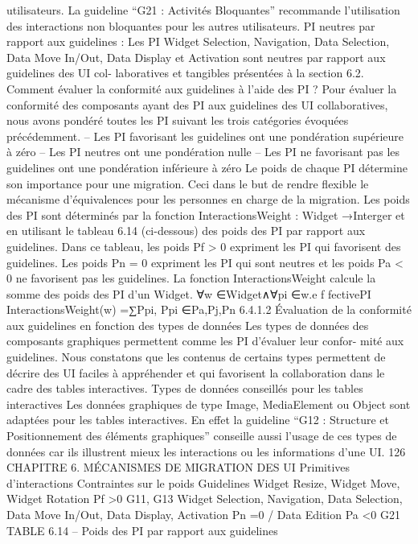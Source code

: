 \documentclass{article}
\begin{document}
utilisateurs. La guideline “G21 : Activités Bloquantes” recommande l’utilisation des interactions non
bloquantes pour les autres utilisateurs.
PI neutres par rapport aux guidelines :
Les PI Widget Selection, Navigation, Data Selection,
Data Move In/Out, Data Display et Activation sont neutres par rapport aux guidelines des UI col-
laboratives et tangibles présentées à la section 6.2.
Comment évaluer la conformité aux guidelines à l’aide des PI ?
Pour évaluer la conformité des
composants ayant des PI aux guidelines des UI collaboratives, nous avons pondéré toutes les PI suivant
les trois catégories évoquées précédemment.
– Les PI favorisant les guidelines ont une pondération supérieure à zéro
– Les PI neutres ont une pondération nulle
– Les PI ne favorisant pas les guidelines ont une pondération inférieure à zéro
Le poids de chaque PI détermine son importance pour une migration. Ceci dans le but de rendre
ﬂexible le mécanisme d’équivalences pour les personnes en charge de la migration. Les poids des PI
sont déterminés par la fonction
InteractionsWeight : Widget →{Interger}
et en utilisant le tableau 6.14 (ci-dessous) des poids des PI par rapport aux guidelines. Dans ce tableau,
les poids Pf > 0 expriment les PI qui favorisent des guidelines. Les poids Pn = 0 expriment les PI qui
sont neutres et les poids Pa < 0 ne favorisent pas les guidelines. La fonction InteractionsWeight
calcule la somme des poids des PI d’un Widget.
∀w ∈{Widget}∧∀pi ∈w.e f fectivePI
InteractionsWeight(w) =∑Ppi, Ppi ∈{Pa,Pj,Pn}
6.4.1.2
Évaluation de la conformité aux guidelines en fonction des types de données
Les types de données des composants graphiques permettent comme les PI d’évaluer leur confor-
mité aux guidelines. Nous constatons que les contenus de certains types permettent de décrire des UI
faciles à appréhender et qui favorisent la collaboration dans le cadre des tables interactives.
Types de données conseillés pour les tables interactives
Les données graphiques de type Image,
MediaElement ou Object sont adaptées pour les tables interactives. En effet la guideline “G12 :
Structure et Positionnement des éléments graphiques” conseille aussi l’usage de ces types de données
car ils illustrent mieux les interactions ou les informations d’une UI.
126
CHAPITRE 6. MÉCANISMES DE MIGRATION DES UI
Primitives
d’interactions
Contraintes sur le
poids
Guidelines
Widget Resize,
Widget Move, Widget
Rotation
Pf >0
G11, G13
Widget Selection,
Navigation, Data
Selection, Data Move
In/Out, Data Display,
Activation
Pn =0
/
Data Edition
Pa <0
G21
TABLE 6.14 – Poids des PI par rapport aux guidelines
\end{document}
